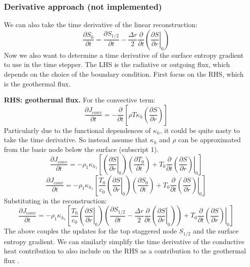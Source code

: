 \subsubsection{Derivative approach (not implemented)}
We can also take the time derivative of the linear reconstruction:
\begin{equation}
\frac{\partial S_0}{\partial t} = \frac{\partial S_{1/2}}{\partial t} - \frac{\Delta r}{2} \frac{\partial}{\partial t} \left( \left. \frac{\partial S}{\partial r}\right|_0 \right)
\end{equation}
Now we also want to determine a time derivative of the surface entropy gradient to use in the time stepper.  The LHS is the radiative or outgoing flux, which depends on the choice of the boundary condition.  First focus on the RHS, which is the geothermal flux.

\textbf{RHS: geothermal flux.}
For the convective term:
\begin{equation}
\frac{\partial J_{conv}}{\partial t} = - \frac{\partial}{\partial t} \left[ \rho T \kappa_h \left( \frac{\partial S}{\partial r} \right) \right]
\end{equation}
Particularly due to the functional dependences of $\kappa_h$, it could be quite nasty to take the time derivative.  So instead assume that $\kappa_h$ and $\rho$ can be approximated from the basic node below the surface (subscript 1).  
\begin{equation}
\frac{\partial J_{conv}}{\partial t} = - \rho_1 \kappa_{h_1} \left[ \left(\left.\frac{\partial S}{\partial r}\right|_0 \right) \left( \frac{\partial T_0}{\partial t} \right) + T_0 \frac{\partial}{\partial t} \left. \left(\frac{\partial S}{\partial r}\right) \right|_0  \right]
\end{equation}
\begin{equation}
\frac{\partial J_{conv}}{\partial t} = - \rho_1 \kappa_{h_1} \left[ \frac{T_0}{c_0} \left(\left.\frac{\partial S}{\partial r}\right|_0 \right) \left( \frac{\partial S_0}{\partial t} \right) + T_0 \frac{\partial}{\partial t} \left. \left(\frac{\partial S}{\partial r}\right) \right|_0  \right]
\end{equation}
Substituting in the reconstruction:
\begin{equation}
\frac{\partial J_{conv}}{\partial t} = - \rho_1 \kappa_{h_1} \left[ \frac{T_0}{c_0} \left(\left.\frac{\partial S}{\partial r}\right|_0 \right) \left( \frac{\partial S_{1/2}}{\partial t} - \frac{\Delta r}{2} \frac{\partial}{\partial t} \left( \left. \frac{\partial S}{\partial r}\right|_0 \right) \right) + T_0 \frac{\partial}{\partial t} \left. \left(\frac{\partial S}{\partial r}\right) \right|_0  \right]
\end{equation}
The above couples the updates for the top staggered node $S_{1/2}$ and the surface entropy gradient.  We can similarly simplify the time derivative of the conductive heat contribution to also include on the RHS as a contribution to the geothermal flux .

